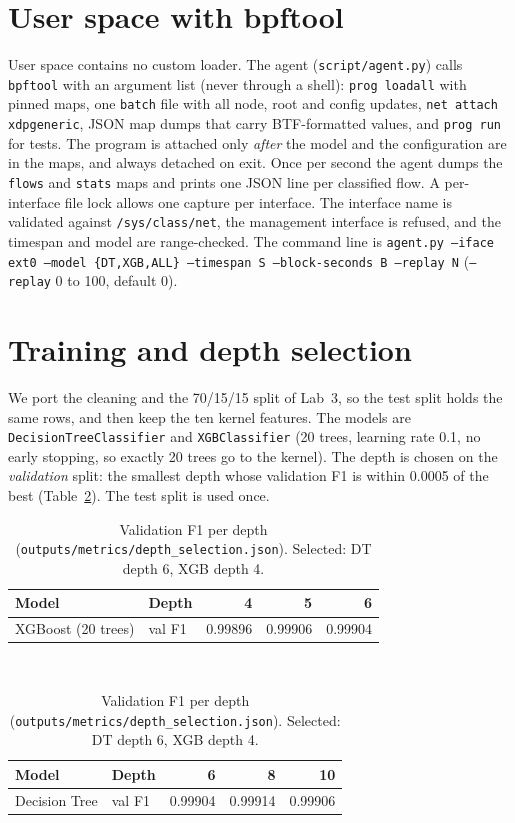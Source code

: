 \section{User space with bpftool}
User space contains no custom loader. The agent (\texttt{script/agent.py}) calls \texttt{bpftool} with an argument list (never through a shell): \texttt{prog loadall} with pinned maps, one \texttt{batch} file with all node, root and config updates, \texttt{net attach xdpgeneric}, JSON map dumps that carry BTF-formatted values, and \texttt{prog run} for tests. The program is attached only \emph{after} the model and the configuration are in the maps, and always detached on exit. Once per second the agent dumps the \texttt{flows} and \texttt{stats} maps and prints one JSON line per classified flow. A per-interface file lock allows one capture per interface. The interface name is validated against \texttt{/sys/class/net}, the management interface is refused, and the timespan and model are range-checked. The command line is \texttt{agent.py --iface ext0 --model \{DT,XGB,ALL\} --timespan S --block-seconds B --replay N} (\texttt{--replay} 0 to 100, default 0).

\section{Training and depth selection}\label{sec:training}
We port the cleaning and the 70/15/15 split of Lab~3, so the test split holds the same rows, and then keep the ten kernel features. The models are \texttt{DecisionTreeClassifier} and \texttt{XGBClassifier} (20 trees, learning rate 0.1, no early stopping, so exactly 20 trees go to the kernel). The depth is chosen on the \emph{validation} split: the smallest depth whose validation F1 is within 0.0005 of the best (Table~\ref{tab:depth}). The test split is used once.

\begin{table}[htb]
\centering\small
\begin{tabular}{@{}llrrr@{}}
\toprule
Model & Depth & 4 & 5 & 6 \\
\midrule
XGBoost (20 trees) & val F1 & 0.99896 & 0.99906 & 0.99904 \\
\bottomrule
\end{tabular}\\[3pt]
\begin{tabular}{@{}llrrr@{}}
\toprule
Model & Depth & 6 & 8 & 10 \\
\midrule
Decision Tree & val F1 & 0.99904 & 0.99914 & 0.99906 \\
\bottomrule
\end{tabular}
\caption{Validation F1 per depth (\texttt{outputs/metrics/depth\_selection.json}). Selected: DT depth 6, XGB depth 4.}\label{tab:depth}
\end{table}

